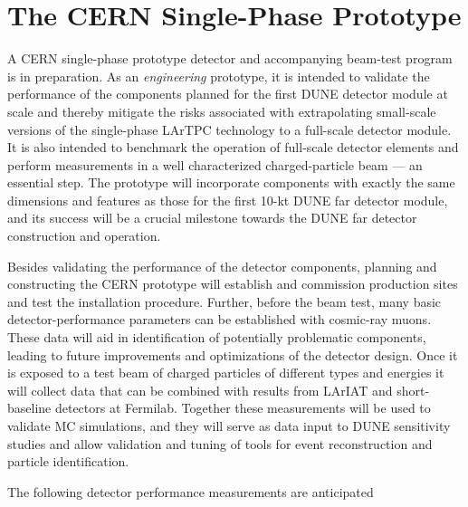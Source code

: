 \section{The CERN Single-Phase Prototype}
\label{sec:proto-cern-single}

A CERN single-phase prototype detector and accompanying beam-test program is in preparation. As an \textit{engineering} prototype, it is intended to validate the performance of the components planned for the first DUNE  detector module at scale and thereby
mitigate the risks associated with extrapolating small-scale versions of the single-phase LArTPC technology
to a full-scale detector module.
It is also intended to benchmark the operation of full-scale detector elements
and perform measurements in a well characterized charged-particle beam --- an essential step.
%
The prototype will incorporate components with exactly
the same dimensions and features as those for the first 10-kt DUNE far detector module, and its success will be a crucial milestone towards the DUNE far detector construction and operation.

Besides validating the performance of the %
detector components, planning and constructing the CERN prototype will
establish and commission production sites and test the installation procedure.
Further, before the beam test, many basic detector-performance parameters can be established with cosmic-ray muons.  These data will aid in identification of potentially problematic components, leading to future improvements and optimizations of the detector design.
%
Once it is exposed to a test beam of charged particles of different types and energies it will %
collect data that %
can be combined with results from %
LArIAT and short-baseline
 detectors at Fermilab. Together these measurements will be used to %
 validate MC simulations, and they will serve as data input to DUNE
 sensitivity studies  and allow validation and tuning of tools for event reconstruction and particle identification.
 
 The following detector performance measurements are anticipated
 

